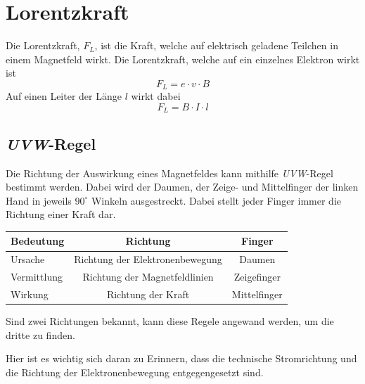 \documentclass{article}
\begin{document}
 
\section{Lorentzkraft}
Die Lorentzkraft, $F_L$, ist die Kraft, welche auf elektrisch geladene Teilchen in einem Magnetfeld wirkt.
Die Lorentzkraft, welche auf ein einzelnes Elektron wirkt ist
\[
 F_L = e \cdot v \cdot B
\] 
Auf einen Leiter der Länge $l$ wirkt dabei
\[
 F_L = B \cdot I \cdot l
\]
 
\subsection{\emph{UVW}-Regel} 
Die Richtung der Auswirkung eines Magnetfeldes kann mithilfe \emph{UVW}-Regel bestimmt werden. Dabei wird der Daumen, der Zeige- und Mittelfinger der linken Hand in jeweils $90^\circ$ Winkeln ausgestreckt. Dabei stellt jeder Finger immer die Richtung einer Kraft dar.
\begin{center}
\begin{tabular}{ lcc }
\toprule
 Bedeutung & Richtung & Finger \\
\midrule  
 \colorbox{red!30}{U}rsache & Richtung der Elektronenbewegung & Daumen \\
 \colorbox{red!30}{V}ermittlung & Richtung der Magnetfeldlinien & Zeigefinger \\
 \colorbox{red!30}{W}irkung & Richtung der Kraft & Mittelfinger \\
\bottomrule 
\end{tabular}
\end{center}
Sind zwei Richtungen bekannt, kann diese Regele angewand werden, um die dritte zu finden.
 
Hier ist es wichtig sich daran zu Erinnern, dass die technische Stromrichtung und die Richtung der Elektronenbewegung entgegengesetzt sind. 
 
\end{document}
